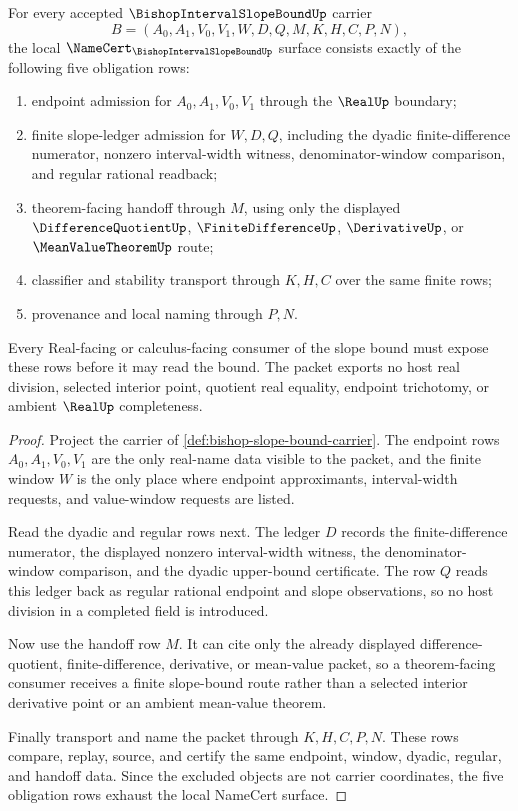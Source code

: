 \begin{theorem}
\label{thm:bishop-slope-bound-namecert}
For every accepted $\BishopIntervalSlopeBoundUp$ carrier
$$
B=(A_0,A_1,V_0,V_1,W,D,Q,M,K,H,C,P,N),
$$
the local $\NameCert_{\BishopIntervalSlopeBoundUp}$ surface consists exactly of the following five obligation rows:
\begin{enumerate}
\item endpoint admission for $A_0,A_1,V_0,V_1$ through the $\RealUp$ boundary;
\item finite slope-ledger admission for $W,D,Q$, including the dyadic finite-difference numerator, nonzero interval-width witness, denominator-window comparison, and regular rational readback;
\item theorem-facing handoff through $M$, using only the displayed $\DifferenceQuotientUp$, $\FiniteDifferenceUp$, $\DerivativeUp$, or $\MeanValueTheoremUp$ route;
\item classifier and stability transport through $K,H,C$ over the same finite rows;
\item provenance and local naming through $P,N$.
\end{enumerate}
Every Real-facing or calculus-facing consumer of the slope bound must expose these rows before it may read the bound. The packet exports no host real division, selected interior point, quotient real equality, endpoint trichotomy, or ambient $\RealUp$ completeness.
\end{theorem}
\begin{proof}
Project the carrier of \autoref{def:bishop-slope-bound-carrier}. The endpoint rows $A_0,A_1,V_0,V_1$ are the only real-name data visible to the packet, and the finite window $W$ is the only place where endpoint approximants, interval-width requests, and value-window requests are listed.

Read the dyadic and regular rows next. The ledger $D$ records the finite-difference numerator, the displayed nonzero interval-width witness, the denominator-window comparison, and the dyadic upper-bound certificate. The row $Q$ reads this ledger back as regular rational endpoint and slope observations, so no host division in a completed field is introduced.

Now use the handoff row $M$. It can cite only the already displayed difference-quotient, finite-difference, derivative, or mean-value packet, so a theorem-facing consumer receives a finite slope-bound route rather than a selected interior derivative point or an ambient mean-value theorem.

Finally transport and name the packet through $K,H,C,P,N$. These rows compare, replay, source, and certify the same endpoint, window, dyadic, regular, and handoff data. Since the excluded objects are not carrier coordinates, the five obligation rows exhaust the local NameCert surface.
\end{proof}

